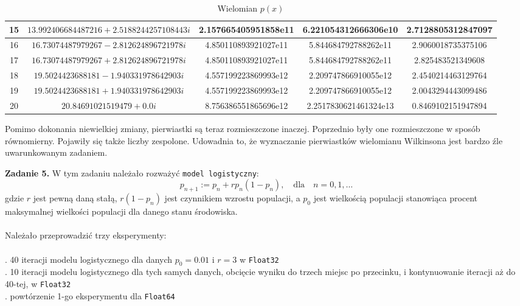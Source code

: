 \documentclass[15pt, a4paper]{article}
\begin{document}
\begin{table}[h]
\begin{adjustbox}{max width=\textwidth}
\begin{tabular}{|c|c|c|c|c|}
        15 & \(13.992406684487216 + 2.5188244257108443i\) & 2.157665405951858e11 & 6.221054312666306e10 & 2.7128805312847097 \\ \hline
        16 & \(16.73074487979267 - 2.812624896721978i\) & 4.850110893921027e11 & 5.844684792788262e11 & 2.9060018735375106 \\ \hline
        17 & \(16.73074487979267 + 2.812624896721978i\) & 4.850110893921027e11 & 5.844684792788262e11 & 2.825483521349608 \\ \hline
        18 & \(19.5024423688181 - 1.940331978642903i\) & 4.557199223869993e12 & 2.209747866910055e12 & 2.4540214463129764 \\ \hline
        19 & \(19.5024423688181 + 1.940331978642903i\) & 4.557199223869993e12 & 2.209747866910055e12 & 2.0043294443099486 \\ \hline
        20 & \(20.84691021519479 + 0.0i\) & 8.756386551865696e12 & 2.2517830621461324e13 & 0.8469102151947894 \\ \hline
    \end{tabular}
    \end{adjustbox}
    \caption{Wielomian \(p(x)\)}
    \label{wielomian p}
\end{table}

\vspace{0.5cm}

\noindent Pomimo dokonania niewielkiej zmiany, pierwiastki są teraz rozmieszczone inaczej. Poprzednio były one rozmieszczone w sposób równomierny. Pojawiły się także liczby zespolone. Udowadnia to, że wyznaczanie pierwiastków wielomianu Wilkinsona jest bardzo źle uwarunkowanym zadaniem.

\vspace{0.5cm}

\noindent\hrulefill


\vspace{0.5cm}

\noindent\textbf{Zadanie 5.} W tym zadaniu należało rozważyć \verb|model logistyczny|:
\[
p_{n+1} := p_n + r p_n (1 - p_n), \quad \mathrm{dla } \quad n = 0, 1, \ldots
\]
gdzie \(r\) jest pewną daną stałą, \(r(1 - p_n)\) jest czynnikiem wzrostu populacji, a \(p_0\) jest
wielkością populacji stanowiąca procent maksymalnej wielkości populacji dla danego
stanu środowiska.\\\\
\noindent Należało przeprowadzić trzy eksperymenty: \\\\
. 40 iteracji modelu logistycznego dla danych \(p_0 = 0.01\) i \(r = 3\) w \verb|Float32| \\
. 10 iteracji modelu logistycznego dla tych samych danych, obcięcie wyniku do trzech miejsc po przecinku, i kontynuowanie iteracji aż do 40-tej, w \verb|Float32| \\
. powtórzenie 1-go eksperymentu dla \verb|Float64| \\\\
\end{document}
